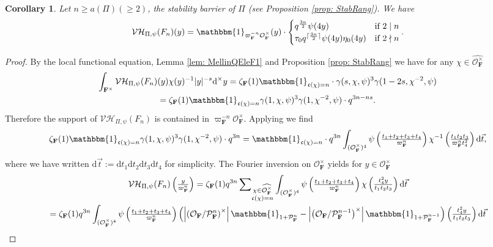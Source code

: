 \documentclass[A4]{amsart}
\def\geq{\geqslant}
\newtheorem{corollary}  [theorem]{Corollary}
\numberwithin{equation}{section} \everymath{\displaystyle}
\newcommand{\id}{\mathbbm{1}}
\newcommand{\ud}{\mathrm{d}}
\newcommand{\F}{\mathbf{F}}
\newcommand{\vO}{\mathcal{O}}
\newcommand{\vP}{\mathcal{P}}
\newcommand{\norm}[1][\cdot]{\lvert #1 \rvert}
\newcommand{\extnorm}[1]{\left\lvert #1 \right\rvert}
\newcommand{\VorH}{\mathcal{VH}}
\newcommand{\cond}{\mathfrak{c}}
\begin{document}
\begin{corollary} \label{cor: VHQEleF1}
	Let $n \geq a(\Pi) (\geq 2)$, the stability barrier of $\Pi$ (see Proposition \ref{prop: StabRang}). We have
	$$ \VorH_{\Pi,\psi}(F_n)(y) = \id_{\varpi_{\F}^{-n} \vO_{\F}^{\times}}(y) \cdot 
	\begin{cases}
		q^{\frac{3n}{2}} \psi(4y) & \text{if } 2 \mid n \\
		\tau_0 q^{\lceil \frac{3n}{2} \rceil} \psi(4y) \eta_0(4y) & \text{if } 2 \nmid n
	\end{cases}. $$
\end{corollary}
\begin{proof}
	By the local functional equation, Lemma \ref{lem: MellinQEleF1} and Proposition \ref{prop: StabRang} we have for any $\chi \in \widehat{\vO_{\F}^{\times}}$
\begin{multline*} 
	\int_{\F^{\times}} \VorH_{\Pi,\psi}(F_n)(y) \chi(y)^{-1} \norm[y]^{-s} \ud^{\times} y = \zeta_{\F}(1) \id_{\cond(\chi) = n} \cdot \gamma(s,\chi,\psi)^3 \gamma(1-2s,\chi^{-2},\psi) \\
	= \zeta_{\F}(1) \id_{\cond(\chi) = n} \gamma(1,\chi,\psi)^3 \gamma(1,\chi^{-2},\psi) \cdot q^{3n-ns}.
\end{multline*}
	Therefore the support of $\VorH_{\Pi,\psi}(F_n)$ is contained in $\varpi_{\F}^{-n} \vO_{\F}^{\times}$. Applying \cite[Exercise 23.5]{BuH06} we find
	$$ \zeta_{\F}(1) \id_{\cond(\chi) = n} \gamma(1,\chi,\psi)^3 \gamma(1,\chi^{-2},\psi) \cdot q^{3n} = \id_{\cond(\chi) = n} \cdot q^{3n} \int_{(\vO_{\F}^{\times})^4} \psi \left( \tfrac{t_1+t_2+t_3+t_4}{\varpi_{\F}^n} \right) \chi^{-1} \left( \tfrac{t_1t_2t_3}{\varpi_{\F}^n t_4^2} \right) \ud \vec{t}, $$
	where we have written $\ud \vec{t} := \ud t_1 \ud t_2 \ud t_3 \ud t_4$ for simplicity. The Fourier inversion on $\vO_{\F}^{\times}$ yields for $y \in \vO_{\F}^{\times}$
\begin{multline*}
	\VorH_{\Pi,\psi}(F_n) \left( \tfrac{y}{\varpi_{\F}^n} \right) = \zeta_{\F}(1) q^{3n} \sideset{}{_{\substack{\chi \in \widehat{\vO_{\F}^{\times}} \\ \cond(\chi)=n}}} \sum \int_{(\vO_{\F}^{\times})^4} \psi \left( \tfrac{t_1+t_2+t_3+t_4}{\varpi_{\F}^n} \right) \chi \left( \tfrac{t_4^2 y}{t_1t_2t_3} \right) \ud \vec{t} \\
	= \zeta_{\F}(1) q^{3n} \int_{(\vO_{\F}^{\times})^4} \psi \left( \tfrac{t_1+t_2+t_3+t_4}{\varpi_{\F}^n} \right) \left( \extnorm{\left( \vO_{\F}/\vP_{\F}^n \right)^{\times}} \id_{1+\vP_{\F}^n} - \extnorm{\left( \vO_{\F}/\vP_{\F}^{n-1} \right)^{\times}} \id_{1+\vP_{\F}^{n-1}} \right) \left( \tfrac{t_4^2 y}{t_1t_2t_3} \right) \ud \vec{t} \\

\end{multline*}
\end{proof}
\end{document}
